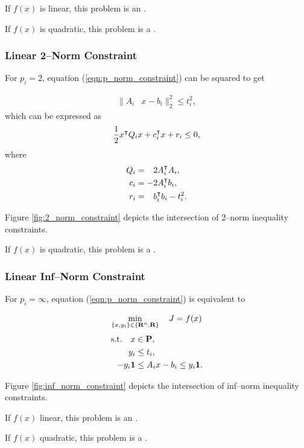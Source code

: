 \documentclass{article}
\begin{document}
    If $f(x)$ is linear, this problem is an \LP.

    If $f(x)$ is quadratic, this problem is a \QP.

\subsubsection{Linear 2--Norm Constraint}
    For $p_i=2$, equation (\ref{eqn:p_norm_constraint}) can be squared to get

    \begin{align*}
        \|A_i&x-b_i\|_2^2\leq t_i^2,
    \end{align*}
    which can be expressed as
    \begin{align*}
        \frac{1}{2} x^\intercal Q_i x + c_i^\intercal x + r_i \leq 0,
    \end{align*}
    where
    \begin{align*}
        Q_i&=\minus 2A_i^\tp A_i,\\
        c_i&= -2A_i^\tp b_i,\\
        r_i&= \minus b_i^\tp b_i-t_i^2.
    \end{align*}

    Figure \ref{fig:2_norm_constraint} depicts the intersection of 
    2--norm inequality constraints.

    If $f(x)$ is quadratic, this problem is a \QCQP.
    
\subsubsection{Linear Inf--Norm Constraint}

    For $p_i=\infty$, equation (\ref{eqn:p_norm_constraint}) is equivalent to

    \begin{align*}
        \min_{\{x,y_i\}\in\{\textbf{R}^n,\textbf{R}\}} \quad J =f(x)
    \end{align*}
    \begin{align*}
        \text{s.t.}\quad x&\in\textbf{P},\\
        y_i&\leq t_i,\\
        -y_i\textbf{1}&\leq A_ix-b_i\leq y_i\textbf{1}.
    \end{align*} 

    Figure \ref{fig:inf_norm_constraint} depicts the intersection of 
    inf--norm inequality constraints.

    If $f(x)$ linear, this problem is an \LP.

    If $f(x)$ quadratic, this problem is a \QP.
\end{document}

